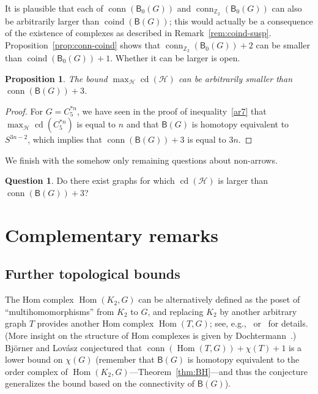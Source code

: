 \documentclass[12pt]{amsart}
\newtheorem{proposition}[theorem]{Proposition}
\theoremstyle{definition}
\newtheorem{question}{Question}
\def\Z{\mathbb{Z}}
\def\HH{\mathcal{H}}
\def\B{\mathsf{B}}
\def\Hom{\operatorname{Hom}}
\def\conn{\operatorname{conn}}
\def\coind{\operatorname{coind}}
\def\cd{\operatorname{cd}}
\begin{document}
It is plausible that each of $\conn(\B_0(G))$ and $\conn_{\Z_2}(\B_0(G))$ can also be arbitrarily larger than $\coind(\B(G))$; this would actually be a consequence of the existence of complexes as described in Remark~\ref{rem:coind-susp}. Proposition~\ref{prop:conn-coind} shows that $\conn_{\Z_2}(\B_0(G))+2$ can be smaller than $\coind(\B_0(G))+1$. Whether it can be larger is open. \label{page:coind-conn2}


\begin{proposition}
    The bound $\max_{\HH}\cd(\HH)$ can be arbitrarily smaller than $\conn(\B(G))+3$.
\end{proposition}

\begin{proof}
    For $G=C_5^{*n}$, we have seen in the proof of inequality~\eqref{ar7} that $\max_{\HH}\cd(C_5^{*n})$ is equal to $n$ and that $\B(G)$ is homotopy equivalent to $S^{3n-2}$, which implies that $\conn(\B(G))+3$ is equal to $3n$. 
\end{proof}


We finish with the somehow only remaining questions about non-arrows. 

\begin{question}\label{q:cdB}
    Do there exist graphs for which $\cd(\HH)$ is larger than $\conn(\B(G))+3$?
\end{question}
\label{page:cdB}


\section{Complementary remarks}\label{sec:compl}

\subsection{Further topological bounds}

The Hom complex $\Hom(K_2,G)$ can be alternatively defined as the poset of ``multihomomorphisms'' from $K_2$ to $G$, and replacing $K_2$ by another arbitrary graph $T$ provides another Hom complex $\Hom(T,G)$; see, e.g.,~\cite[Chapter 5, Section 5.9]{matousek2008using} or~\cite[Chapter 2, Section 2.3]{de2012course} for details. (More insight on the structure of Hom complexes is given by Dochtermann~\cite{Dochtermann09}.) Bj\"orner and Lov\'asz conjectured that $\conn(\Hom(T,G))+\chi(T)+1$ is a lower bound on $\chi(G)$ (remember that $\B(G)$ is homotopy equivalent to the order complex of $\Hom(K_2,G)$---Theorem~\ref{thm:BH}---and thus the conjecture generalizes the bound based on the connectivity of $\B(G)$).
\end{document}
